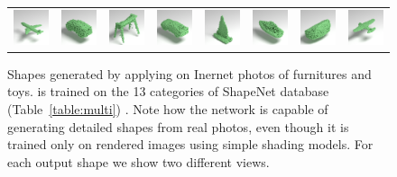 \begin{figure}[t]
\begin{tabular}{cccccccc}
\includegraphics[width=.12\linewidth]{MRTNet/rendering/playdoh_shapes/plane3_mrt_v1.png} &
\includegraphics[width=.12\linewidth]{MRTNet/rendering/playdoh_shapes/car8_clipped_rev_1_mrt_v1.png} &
\includegraphics[width=.12\linewidth]{MRTNet/rendering/playdoh_shapes/5701697_clipped_rev_1_mrt_v1.png} &
\includegraphics[width=.12\linewidth]{MRTNet/rendering/playdoh_shapes/cara_clipped_rev_1_mrt_v1.png} &
\includegraphics[width=.12\linewidth]{MRTNet/rendering/playdoh_shapes/ship9_mrt_v1.png} &
\includegraphics[width=.12\linewidth]{MRTNet/rendering/playdoh_shapes/ship3_mrt_v1.png} &
\includegraphics[width=.12\linewidth]{MRTNet/rendering/playdoh_shapes/Play-Doh-Sofa_clipped_rev_1_mrt_v1.png} &
\includegraphics[width=.12\linewidth]{MRTNet/rendering/playdoh_shapes/plane2_mrt_v1.png} \\

\end{tabular}
\vspace{-8pt}
    \caption{\label{fig:real} 
    \small Shapes generated by applying \mrtnet on Inernet photos of furnitures and toys. \mrtnet is trained on the 13 categories of ShapeNet database (Table~\ref{table:multi}) . Note how the network is capable of generating detailed shapes from real photos, even though it is trained only on rendered images using simple shading models. For each output shape we show two different views.
    }
\vspace{-18pt}
\end{figure}

